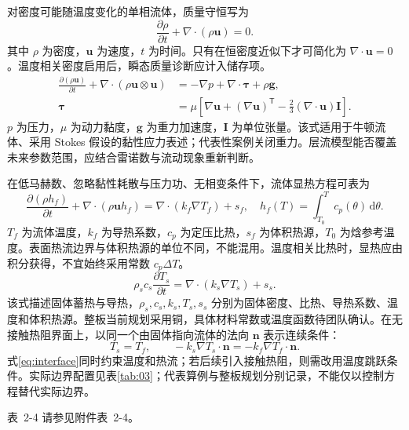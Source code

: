 \documentclass[UTF8]{midterm}
\makeatletter
\newcommand{\submissionnumber}[1]{\def\@currentlabel{#1}}
\makeatother
\begin{document}
对密度可能随温度变化的单相流体，质量守恒写为
\begin{equation}\frac{\partial\rho}{\partial t}+\nabla\cdot(\rho\bm u)=0.\label{eq:mass}\end{equation}
其中 $\rho$ 为密度，$\bm u$ 为速度，$t$ 为时间。只有在恒密度近似下才可简化为 $\nabla\cdot\bm u=0$。温度相关密度启用后，瞬态质量诊断应计入储存项。
\begin{equation}\begin{aligned}
\frac{\partial(\rho\bm u)}{\partial t}+\nabla\cdot(\rho\bm u\otimes\bm u)
&=-\nabla p+\nabla\cdot\bm\tau+\rho\bm g,\\
\bm\tau&=\mu\left[\nabla\bm u+(\nabla\bm u)^{\mathsf T}-\frac23(\nabla\cdot\bm u)\bm I\right].
\end{aligned}\label{eq:momentum}
\end{equation}
$p$ 为压力，$\mu$ 为动力黏度，$\bm g$ 为重力加速度，$\bm I$ 为单位张量。该式适用于牛顿流体、采用 Stokes 假设的黏性应力表述；代表性案例关闭重力。层流模型能否覆盖未来参数范围，应结合雷诺数与流动现象重新判断。

在低马赫数、忽略黏性耗散与压力功、无相变条件下，流体显热方程可表为
\begin{equation}
\frac{\partial(\rho h_f)}{\partial t}+\nabla\cdot(\rho\bm u h_f)
=\nabla\cdot(k_f\nabla T_f)+s_f,
\quad h_f(T)=\int_{T_0}^{T}c_p(\theta)\,\mathrm d\theta.\label{eq:fluidenergy}
\end{equation}
$T_f$ 为流体温度，$k_f$ 为导热系数，$c_p$ 为定压比热，$s_f$ 为体积热源，$T_0$ 为焓参考温度。表面热流边界与体积热源的单位不同，不能混用。温度相关比热时，显热应由积分获得，不宜始终采用常数 $c_p\Delta T$。
\begin{equation}
\rho_s c_s\frac{\partial T_s}{\partial t}=\nabla\cdot(k_s\nabla T_s)+s_s.\label{eq:solidenergy}
\end{equation}
该式描述固体蓄热与导热，$\rho_s,c_s,k_s,T_s,s_s$ 分别为固体密度、比热、导热系数、温度和体积热源。整板当前规划采用铜，具体材料常数或温度函数待团队确认。在无接触热阻界面上，以同一个由固体指向流体的法向 $\bm n$ 表示连续条件：
\begin{equation}
T_s=T_f,\qquad -k_s\nabla T_s\cdot\bm n=-k_f\nabla T_f\cdot\bm n.\label{eq:interface}
\end{equation}
式\eqref{eq:interface}同时约束温度和热流；若后续引入接触热阻，则需改用温度跳跃条件。实际边界配置见表\ref{tab:03}；代表算例与整板规划分别记录，不能仅以控制方程替代实际边界。

\par\noindent \begingroup\submissionnumber{2-4}\label{tab:03}\endgroup 表~2-4 请参见附件表~2-4。\par
\end{document}
